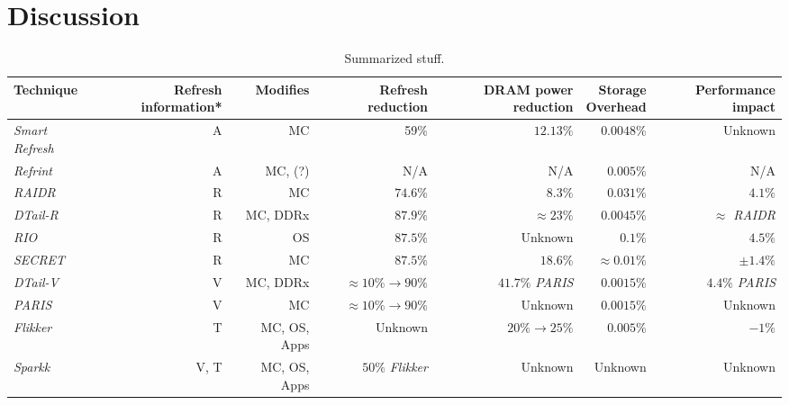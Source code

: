 \section{Discussion} 
\label{sec:disc}

\begin{table*}[t]
	\caption{\label{tbl:summary}Summarized stuff.}
        \begin{center}
			\normalsize
			\begin{tabular}{ l r r r r r r}
				\textbf{Technique} & \parbox{2cm}{ \textbf{Refresh \linebreak information*}} & \textbf{Modifies} & \parbox{1.7cm}{ \textbf{Refresh \linebreak reduction}} & \parbox{2.2cm}{ \textbf{DRAM power \linebreak reduction}} & \parbox{1.2cm}{\textbf{Storage \newline Overhead}} & \parbox{1.5cm}{\textbf{Performance impact}} \vspace{0.05cm} \\
				\hline
				\textit{Smart Refresh} & A & MC & 59\% & $12.13\%$ & $0.0048\%$  & Unknown  \\
				\textit{Refrint} & A & MC, (?) & N/A & N/A  & $0.005\%$  & N/A  \\
				\hline
				\textit{RAIDR} & R & MC & $74.6\%$ & $8.3\%$  & $0.031\%$  & $4.1\%$  \\
				\textit{DTail-R} & R & MC, DDRx & $87.9\%$ & $\approx 23\%$  & $0.0045\%$ & $\approx$ \textit{RAIDR} \\
				\textit{RIO} & R & OS & $87.5\%$ & Unknown  & $0.1\%$  & $4.5\%$ \\
				\textit{SECRET} & R & MC & $87.5\%$ & $18.6\%$  & $\approx 0.01\%$  & $\pm 1.4\%$  \\
				\hline
				\textit{DTail-V} & V & MC, DDRx & $\approx 10\% \to 90\% $ & $41.7\%$ \textit{PARIS}  & $0.0015\%$ & $4.4\%$ \textit{PARIS}  \\
				\textit{PARIS} & V & MC & $\approx 10\% \to 90\%$ & Unknown  & $0.0015\%$  & Unknown \\
				\hline
				\textit{Flikker} & T & MC, OS, Apps & Unknown & $20\% \to 25\%$  & $0.005\%$  & $-1\%$   \\
				\textit{Sparkk} & V, T  & MC, OS, Apps &  $50\%$ \textit{Flikker} & Unknown & Unknown  & Unknown \\
				\hline
			\end{tabular}
		\end{center}
\end{table*}

